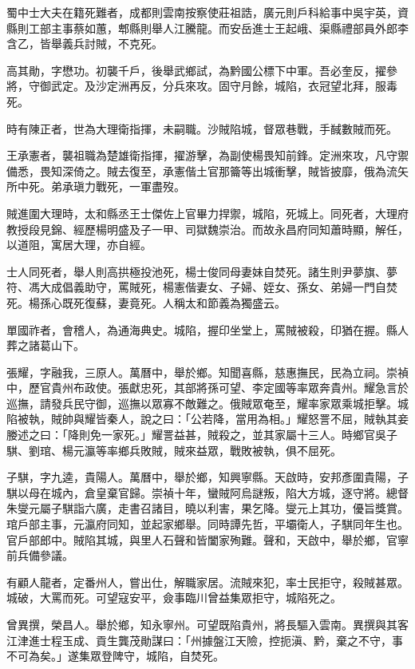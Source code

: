 \begin{pinyinscope}
蜀中士大夫在籍死難者，成都則雲南按察使莊祖誥，廣元則戶科給事中吳宇英，資縣則工部主事蔡如蕙，郫縣則舉人江騰龍。而安岳進士王起峨、渠縣禮部員外郎李含乙，皆舉義兵討賊，不克死。

高其勛，字懋功。初襲千戶，後舉武鄉試，為黔國公標下中軍。吾必奎反，擢參將，守御武定。及沙定洲再反，分兵來攻。固守月餘，城陷，衣冠望北拜，服毒死。

時有陳正者，世為大理衛指揮，未嗣職。沙賊陷城，督眾巷戰，手馘數賊而死。

王承憲者，襲祖職為楚雄衛指揮，擢游擊，為副使楊畏知前鋒。定洲來攻，凡守禦備悉，畏知深倚之。賊去復至，承憲偕土官那籥等出城衝擊，賊皆披靡，俄為流矢所中死。弟承瑱力戰死，一軍盡歿。

賊進圍大理時，太和縣丞王士傑佐上官畢力捍禦，城陷，死城上。同死者，大理府教授段見錦、經歷楊明盛及子一甲、司獄魏崇治。而故永昌府同知蕭時顯，解任，以道阻，寓居大理，亦自經。

士人同死者，舉人則高拱極投池死，楊士俊同母妻妹自焚死。諸生則尹夢旗、夢符、馮大成倡義助守，罵賊死，楊憲偕妻女、子婦、姪女、孫女、弟婦一門自焚死。楊孫心既死復蘇，妻竟死。人稱太和節義為獨盛云。

單國祚者，會稽人，為通海典史。城陷，握印坐堂上，罵賊被殺，印猶在握。縣人葬之諸葛山下。

張耀，字融我，三原人。萬曆中，舉於鄉。知聞喜縣，慈惠撫民，民為立祠。崇禎中，歷官貴州布政使。張獻忠死，其部將孫可望、李定國等率眾奔貴州。耀急言於巡撫，請發兵民守御，巡撫以眾寡不敵難之。俄賊眾奄至，耀率家眾乘城拒擊。城陷被執，賊帥與耀皆秦人，說之曰：「公若降，當用為相。」耀怒詈不屈，賊執其妾媵述之曰：「降則免一家死。」耀詈益甚，賊殺之，並其家屬十三人。時鄉官吳子騏、劉琯、楊元瀛等率鄉兵敗賊，賊來益眾，戰敗被執，俱不屈死。

子騏，字九逵，貴陽人。萬曆中，舉於鄉，知興寧縣。天啟時，安邦彥圍貴陽，子騏以母在城內，倉皇棄官歸。崇禎十年，蠻賊阿烏謎叛，陷大方城，逐守將。總督朱燮元屬子騏詣六廣，走書召諸目，曉以利害，果乞降。燮元上其功，優旨獎賞。琯戶部主事，元瀛府同知，並起家鄉舉。同時譚先哲，平壩衛人，子騏同年生也。官戶部郎中。賊陷其城，與里人石聲和皆闔家殉難。聲和，天啟中，舉於鄉，官寧前兵備參議。

有顧人龍者，定番州人，嘗出仕，解職家居。流賊來犯，率士民拒守，殺賊甚眾。城破，大罵而死。可望寇安平，僉事臨川曾益集眾拒守，城陷死之。

曾異撰，榮昌人。舉於鄉，知永寧州。可望既陷貴州，將長驅入雲南。異撰與其客江津進士程玉成、貢生龔茂勛謀曰：「州據盤江天險，控扼滇、黔，棄之不守，事不可為矣。」遂集眾登陴守，城陷，自焚死。


\end{pinyinscope}
